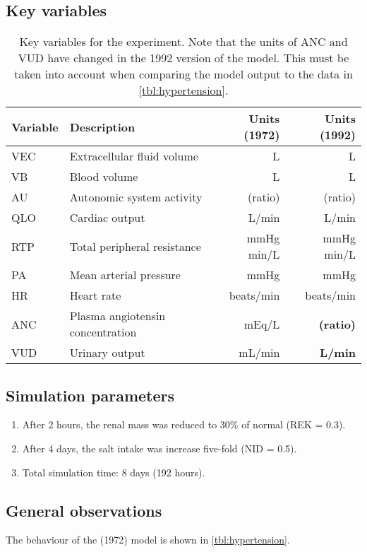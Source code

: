 \label{exp:hypertension}

\subsection{Key variables}
\begin{table}[!h]
  \centering
  \begin{tabularx}{\textwidth}{lXrr}
    \toprule
    Variable & Description & Units (1972) & Units (1992) \\
    \midrule
    VEC & Extracellular fluid volume & L & L \\
    VB & Blood volume & L & L \\
    AU & Autonomic system activity & (ratio) & (ratio) \\
    QLO & Cardiac output & L/min & L/min \\
    RTP & Total peripheral resistance & mmHg min/L & mmHg min/L \\
    PA & Mean arterial pressure & mmHg & mmHg \\
    HR & Heart rate & beats/min & beats/min \\
    ANC & Plasma angiotensin concentration & mEq/L & \textbf{(ratio)} \\
    VUD & Urinary output & mL/min & \textbf{L/min} \\
    \bottomrule
  \end{tabularx}
  \caption{Key variables for the experiment. Note that the units of ANC and VUD have changed in the 1992 version of the model. This must be taken into account when comparing the model output to the data in \autoref{tbl:hypertension}.}
\end{table}

\subsection{Simulation parameters}
\begin{enumerate}
  \item After 2 hours, the renal mass was reduced to 30\% of normal (REK = 0.3).
  \item After 4 days, the salt intake was increase five-fold (NID = 0.5).
  \item Total simulation time: 8 days (192 hours).
\end{enumerate}

\subsection{General observations}
The behaviour of the (1972) model is shown in \autoref{tbl:hypertension}.

